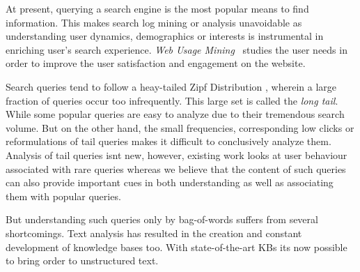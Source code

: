 At present, querying a search engine is the most popular means to find information. This makes
search log mining or analysis unavoidable as understanding user dynamics, demographics or interests
is instrumental in enriching user's search experience. \emph{Web Usage Mining}~\cite{silvestri2010mining}  
studies the user needs in order to improve the user satisfaction and engagement on the website. 

Search queries tend to follow a heay-tailed Zipf Distribution \cite{baeza2007impact}, wherein a large 
fraction of queries occur too infrequently. This large set is called the \emph{long tail}. While some 
popular queries  are easy to analyze due to their tremendous search volume. 
But on the other hand, the small frequencies, corresponding low clicks or reformulations 
of tail queries makes it difficult to conclusively analyze them. Analysis of tail queries isnt new, 
however, existing work \cite{Doug2007Sig,Goel2010Wsdm} looks at user behaviour associated with
rare queries whereas we believe that the content of such queries can also provide important cues in both
understanding as well as associating them with popular queries. 

But understanding such queries only by bag-of-words suffers from several shortcomings.  
Text analysis has resulted in the creation and constant development of knowledge bases too. With 
state-of-the-art KBs its now possible to bring order to unstructured text.  




